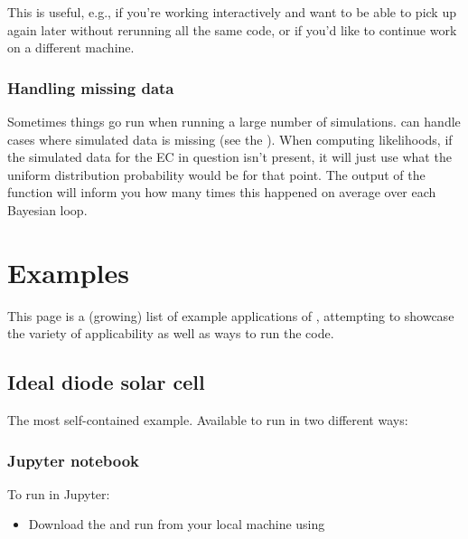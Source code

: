 \documentclass[letterpaper,10pt,english]{sphinxmanual}
\begin{document}
This is useful, e.g., if you’re working interactively and want to be able to pick up again later without rerunning all the same code, or if you’d like to continue work on a different machine.


\subsection{Handling missing data}
\label{\detokenize{manual:handling-missing-data}}
Sometimes things go run when running a large number of simulations.  can handle cases where simulated data is missing (see the {\hyperref[\detokenize{examples:sns}]{}}). When computing likelihoods, if the simulated data for the EC in question isn’t present, it will just use what the uniform distribution probability would be for that point. The output of the  function will inform you how many times this happened on average over each Bayesian loop.


\chapter{Examples}
\label{\detokenize{examples:examples}}\label{\detokenize{examples::doc}}
This page is a (growing) list of example applications of , attempting to showcase the variety of applicability as well as ways to run the code.


\section{Ideal diode solar cell}
\label{\detokenize{examples:id}}\label{\detokenize{examples:ideal-diode-solar-cell}}
The most self-contained example. Available to run in two different ways:


\subsection{Jupyter notebook}
\label{\detokenize{examples:jupyter-notebook}}
To run in Jupyter:
\begin{itemize}
\item {}
Download the  and run from your local machine using 

\end{itemize}
\end{document}
